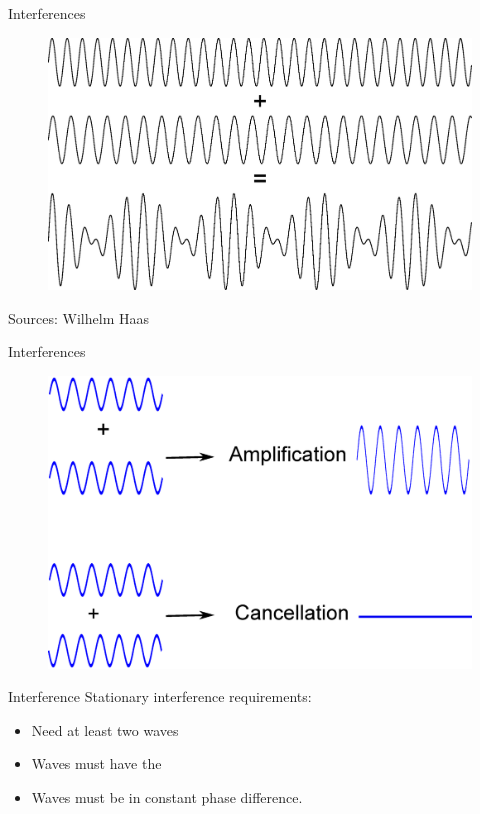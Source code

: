 \begin{frame}{Interferences}
    \begin{figure}
        \includegraphics[height=0.8\textheight]{images/interferencesex.eps}
    \end{figure}

    \begin{flushright}
        \scriptsize Sources: Wilhelm Haas
    \end{flushright}
\end{frame}

\begin{frame}{Interferences}
    \begin{figure}
        \includegraphics[height=0.8\textheight]{images/interferences3.eps}
    \end{figure}
\end{frame}

\begin{frame}[c]{Interference}
    Stationary interference requirements:
    \vspace{0.3cm}
    \begin{itemize}
        \setlength\itemsep{0.3cm}
        \item Need at least two waves
        \item Waves must have the 
        \item Waves must be in constant phase difference.
    \end{itemize}
\end{frame}


